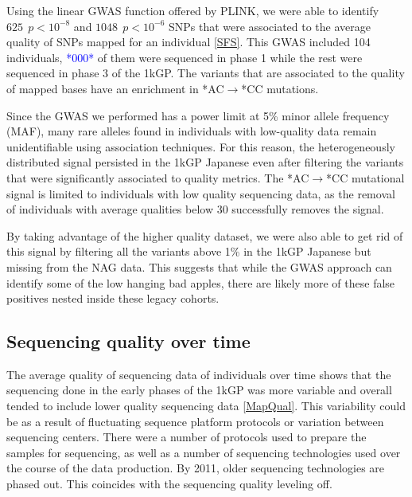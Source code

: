 \documentclass[9pt,lineno]{elife}
\newcommand{\todo}[1]{\textcolor{blue}{*#1*}}
\begin{document}
Using the linear GWAS function offered by PLINK, we were able to identify $625\ \  p < 10^{-8}$ and $1048\ \ p < 10^{-6}$ SNPs that were associated to the average quality of SNPs mapped for an individual \ref{SFS}.  This GWAS included 104 individuals, \todo{000} of them were sequenced in phase 1 while the rest were sequenced in phase 3 of the 1kGP.
The variants that are associated to the quality of mapped bases have an enrichment in *AC${\rightarrow}$*CC mutations. 

Since the GWAS we performed has a power limit at 5\% minor allele frequency (MAF), many rare alleles found in individuals with low-quality data remain unidentifiable using association techniques.
For this reason, the heterogeneously distributed signal persisted in the 1kGP Japanese even after filtering the variants that were significantly associated to quality metrics.
The *AC${\rightarrow}$*CC mutational signal is limited to individuals with low quality sequencing data, as the removal of individuals with average qualities below 30 successfully removes the signal.

By taking advantage of the higher quality dataset, we were also able to get rid of this signal by filtering all the variants above 1\% in the 1kGP Japanese but missing from the NAG data.
This suggests that while the GWAS approach can identify some of the low hanging bad apples, there are likely more of these false positives nested inside these legacy cohorts. 

	\subsection{Sequencing quality over time}
The average quality of sequencing data of individuals over time shows that the sequencing done in the early phases of the 1kGP was more variable and overall tended to include lower quality sequencing data \ref{MapQual}.
This variability could be as a result of fluctuating sequence platform protocols or variation between sequencing centers.
There were a number of protocols used to prepare the samples for sequencing, as well as a number of sequencing technologies used over the course of the data production.
By 2011, older sequencing technologies are phased out.
This coincides with the sequencing quality leveling off.
\end{document}
